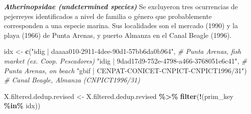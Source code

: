 \documentclass[sn-apa,pdflatex]{sn-jnl}
\newenvironment{Shaded}{\begin{snugshade}}{\end{snugshade}}
\newcommand{\CommentTok}[1]{\textcolor[rgb]{0.56,0.35,0.01}{\textit{#1}}}
\newcommand{\FunctionTok}[1]{\textcolor[rgb]{0.13,0.29,0.53}{\textbf{#1}}}
\newcommand{\NormalTok}[1]{#1}
\newcommand{\OtherTok}[1]{\textcolor[rgb]{0.56,0.35,0.01}{#1}}
\newcommand{\SpecialCharTok}[1]{\textcolor[rgb]{0.81,0.36,0.00}{\textbf{#1}}}
\newcommand{\StringTok}[1]{\textcolor[rgb]{0.31,0.60,0.02}{#1}}
\begin{document}
\begin{Shaded}
\end{Shaded}

\textbf{\emph{Atherinopsidae (undetermined species)}} Se excluyeron tres
ocurrencias de pejerreyes identificados a nivel de familia o género que
probablemente corresponden a una especie marina. Sus localidades son el
mercado (1990) y la playa (1966) de Punta Arenas, y puerto Almanza en el
Canal Beagle (1996).

\begin{Shaded}
\begin{Highlighting}[]
\NormalTok{idx }\OtherTok{\textless{}{-}} \FunctionTok{c}\NormalTok{(}\StringTok{"idig | daaaa010{-}2911{-}4dee{-}90d1{-}57bb6da0b964"}\NormalTok{, }\CommentTok{\# Punta Arenas, fish market (ex. Coop. Pescadores)}
         \StringTok{"idig | 9dad17d9{-}752e{-}4798{-}a466{-}3768051e6c41"}\NormalTok{, }\CommentTok{\# Punta Arenas, on beach}
         \StringTok{"gbif | CENPAT{-}CONICET{-}CNPICT{-}CNPICT1996/31"}\NormalTok{)  }\CommentTok{\# Canal Beagle, Almanza (CNPICT1996/31)}

\NormalTok{X.filtered.dedup.revised }\OtherTok{\textless{}{-}}\NormalTok{ X.filtered.dedup.revised }\SpecialCharTok{\%\textgreater{}\%} \FunctionTok{filter}\NormalTok{(}\SpecialCharTok{!}\NormalTok{(prim\_key  }\SpecialCharTok{\%in\%}\NormalTok{ idx))}
\end{Highlighting}
\end{Shaded}
\end{document}
